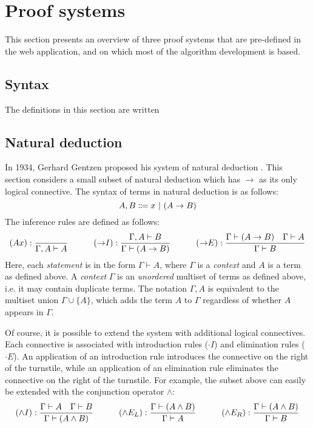 \section{Proof systems}
This section presents an overview of three proof systems that are pre-defined in the web application, and on which most of the algorithm development is based.

\subsection{Syntax}
The definitions in this section are written 

\subsection{Natural deduction}
In 1934, Gerhard Gentzen proposed his system of natural deduction \cite{gentzen:1969}. This section considers a small subset of natural deduction which has $\to$ as its only logical connective. The syntax of terms in natural deduction is as follows:
\[
    A, B \Coloneqq x \ |\  (A \to B)
\]
The inference rules are defined as follows:
{
    \derivationfont
    \[
        (Ax): \frac{}{\Gamma, A \vdash A} \quad\quad\quad (\mathord{\to} I): \frac{\Gamma, A \vdash B}{\Gamma \vdash (A \to B)} \quad\quad\quad (\mathord{\to} E): \frac{\Gamma \vdash (A \to B) \quad \Gamma \vdash A}{\Gamma \vdash B}
    \]
}%
Here, each \textit{statement} is in the form $\Gamma \vdash A$, where $\Gamma$ is a \textit{context} and $A$ is a term as defined above. A \textit{context} $\Gamma$ is an \textit{unordered} multiset of terms as defined above, i.e. it may contain duplicate terms. The notation $\Gamma, A$ is equivalent to the multiset union $\Gamma \cup \{ A \}$, which adds the term $A$ to $\Gamma$ regardless of whether $A$ appears in $\Gamma$.

Of course, it is possible to extend the system with additional logical connectives. Each connective is associated with introduction rules ($\cdot I$) and elimination rules ($\cdot E$). An application of an introduction rule introduces the connective on the right of the turnstile, while an application of an elimination rule eliminates the connective on the right of the turnstile. For example, the subset above can easily be extended with the conjunction operator $\land$:
{
    \derivationfont
    \[
        (\land I): \frac{\Gamma \vdash A \quad \Gamma \vdash B}{\Gamma \vdash (A \land B)} \quad\quad\quad (\land E_L): \frac{\Gamma \vdash (A \land B)}{\Gamma \vdash A} \quad\quad\quad (\land E_R): \frac{\Gamma \vdash (A \land B)}{\Gamma \vdash B}
    \]
}%

